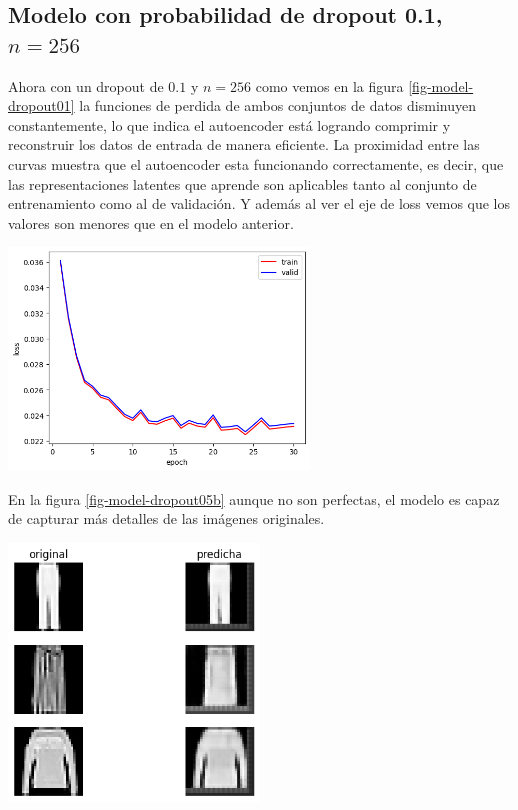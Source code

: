 \documentclass[aps,prl,reprint,groupedaddress]{revtex4-2}
\newenvironment{Figura}
  {\par\medskip\noindent\minipage{\linewidth}}
  {\endminipage\par\medskip}
\begin{document}
\subsection{Modelo con probabilidad de dropout 0.1, $n=256$}

Ahora con un dropout de $0.1$ y $n=256$ como vemos en la figura 
\ref{fig-model-dropout01} la funciones de perdida de ambos conjuntos de datos 
disminuyen constantemente, lo que indica el autoencoder está logrando comprimir 
y reconstruir los datos de entrada de manera eficiente. La proximidad entre las 
curvas muestra que el autoencoder esta funcionando correctamente, es decir, 
que las representaciones latentes que aprende son aplicables tanto al conjunto 
de entrenamiento como al de validación. Y además al ver el eje de loss vemos
que los valores son menores que en el modelo anterior.
\begin{Figura}
  \centering
  \includegraphics[width=0.60\textwidth]{figs1/modelo_n256_dropout01.png}
  \label{fig-model-dropout01-256}
\end{Figura}

En la figura \ref{fig-model-dropout05b} aunque no son perfectas, el modelo es 
capaz de capturar más detalles de las imágenes originales.
\begin{Figura}
  \centering
  \includegraphics[width=0.5\textwidth]{figs1/test_modelo_n256_dropout01.png}
  \label{fig-model-dropout01b-256}
\end{Figura}
\end{document}

